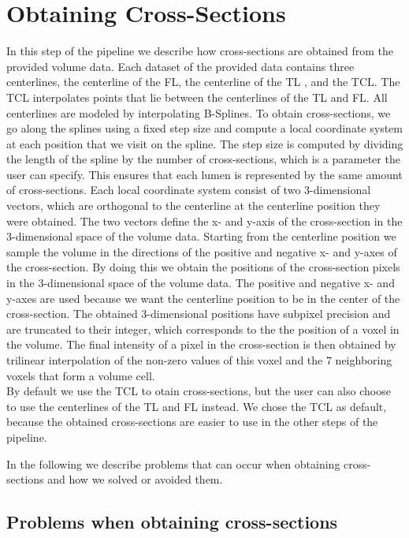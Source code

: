 \documentclass[thesis.tex]{subfiles}
\begin{document}
\section{Obtaining Cross-Sections}
In this step of the pipeline we describe how cross-sections are obtained from the provided volume data. Each dataset of the provided data contains three centerlines, the centerline of the FL, the centerline of the TL , and the TCL. The TCL interpolates points that lie between the centerlines of the TL and FL. All centerlines are modeled by interpolating B-Splines. To obtain cross-sections, we go along the splines using a fixed step size and compute a local coordinate system at each position that we visit on the spline. The step size is computed by dividing the length of the spline by the number of cross-sections, which is a parameter the user can specify. This ensures that each lumen is represented by the same amount of cross-sections. Each local coordinate system consist of two 3-dimensional vectors, which are orthogonal to the centerline at the centerline position they were obtained. The two vectors define the x- and y-axis of the cross-section in the 3-dimensional space of the volume data. Starting from the centerline position we sample the volume in the directions of the positive and negative x- and y-axes of the cross-section. By doing this we obtain the positions of the cross-section pixels in the 3-dimensional space of the volume data. The positive and negative x- and y-axes are used because we want the centerline position to be in the center of the cross-section. The obtained 3-dimensional positions have subpixel precision and are truncated to their integer, which corresponds to the the position of a voxel in the volume. The final intensity of a pixel in the cross-section is then obtained by trilinear interpolation of the non-zero values of this voxel and the 7 neighboring voxels that form a volume cell. \\
By default we use the TCL to otain cross-sections, but the user can also choose to use the centerlines of the TL and FL instead. We chose the TCL as default, because the obtained cross-sections are easier to use in the other steps of the pipeline.

In the following we describe problems that can occur when obtaining cross-sections and how we solved or avoided them. 

\subsection{Problems when obtaining cross-sections}
\end{document}
